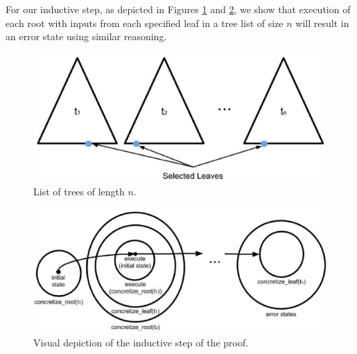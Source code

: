 For our inductive step, as depicted in Figures  \ref{fig:tlist} and \ref{fig:indstep}, we show that execution of each root with inputs from each specified leaf in a tree list of size $n$ will result in an error state using similar reasoning.

\begin{figure}
\label{fig:tlist}
\includegraphics[width=\textwidth]{tlist.eps}
\caption{List of trees of length $n$.}
\end{figure}

\begin{figure}
\label{fig:indstep}
\includegraphics[width=\textwidth]{set4.eps}
\caption{Visual depiction of the inductive step of the proof.}
\end{figure}